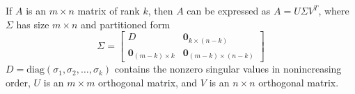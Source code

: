 \documentclass{article}
\begin{document}
\begin{tcolorbox}[colback=red!4, colframe=red!60!black,
  title={\textbf{Theorem 9.4.3 --- Singular Value Decomposition (Brief Form)}},
  boxrule=0.5mm, arc=3mm]
If $A$ is an $m\times n$ matrix of rank $k$, then $A$ can be expressed as
$A = U\Sigma V^T$, where $\Sigma$ has size $m\times n$ and partitioned form
\[
  \Sigma = \left[\begin{array}{c|c}
    D & \mathbf{0}_{k\times(n-k)}\\
    \hline
    \mathbf{0}_{(m-k)\times k} & \mathbf{0}_{(m-k)\times(n-k)}
  \end{array}\right]
\]
$D = \mathrm{diag}(\sigma_1,\sigma_2,\ldots,\sigma_k)$ contains the nonzero singular
values in nonincreasing order, $U$ is an $m\times m$ orthogonal matrix, and $V$ is an
$n\times n$ orthogonal matrix.
\end{tcolorbox}
\end{document}
